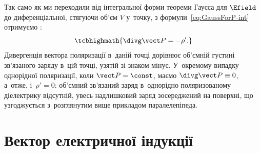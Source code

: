 Так само як ми переходили від інтегральної форми теореми Гаусса для $\Efield$ до
диференціальної, стягуючи об'єм $V$ у~точку, з формули~\eqref{eq:GaussForP-int} отримуємо
:
\begin{equation}\label{eq:GaussForP-diff}
	\tcbhighmath{
		\divg \vect P = -\rho'.
	}
\end{equation}
Дивергенція вектора поляризації в~даній точці дорівнює об'ємній густині зв'язаного заряду
в~цій точці, узятій зі знаком мінус. У~окремому випадку однорідної поляризації, коли
$\vect P = \const$, маємо $\divg \vect P \equiv 0$, а~отже, і~$\rho' = 0$: об'ємний
зв'язаний заряд в~однорідно поляризованому діелектрику відсутній, увесь надлишковий заряд
зосереджений на поверхні, що узгоджується з~розглянутим вище прикладом паралелепіпеда.


\section{Вектор електричної індукції}\label{sec:Dfield}\hypertarget{electric-displacement-vector}{}


